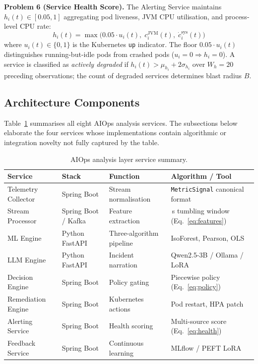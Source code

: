 \documentclass[a4paper]{lipics-v2021}
\newcommand{\mypara}[1]{{\vspace{0.1mm}\noindent\textbf{#1}}}
\begin{document}
\mypara{Problem 6 (Service Health Score).}
The Alerting Service maintains $h_i(t) \in [0.05, 1]$ aggregating pod liveness,
JVM CPU utilisation, and process-level CPU rate:
\begin{equation}
    h_i(t) = \max\!\bigl(0.05 \cdot u_i(t),\; c_i^{\text{JVM}}(t),\;
    \dot{c}_i^{\text{sys}}(t)\bigr)
    \label{eq:health}
\end{equation}
where $u_i(t) \in \{0,1\}$ is the Kubernetes \texttt{up} indicator. The floor
$0.05 \cdot u_i(t)$ distinguishes running-but-idle pods from crashed pods
($u_i{=}0 \Rightarrow h_i{=}0$). A service is classified as \textit{actively
degraded} if $h_i(t) > \mu_{h_i} + 2\sigma_{h_i}$ over $W_h{=}20$ preceding
observations; the count of degraded services determines blast radius $B$.

\subsection{Architecture Components}

Table~\ref{tab:components} summarises all eight AIOps analysis services. The
subsections below elaborate the four services whose implementations contain
algorithmic or integration novelty not fully captured by the table.

\begin{table}[t]
\caption{AIOps analysis layer service summary.}
\label{tab:components}
\small
\begin{tabular}{>{\raggedright\arraybackslash}p{3.0cm}
                >{\raggedright\arraybackslash}p{2.5cm}
                >{\raggedright\arraybackslash}p{2.8cm}
                >{\raggedright\arraybackslash}p{4.0cm}}
\toprule
\textbf{Service} & \textbf{Stack} & \textbf{Function} & \textbf{Algorithm / Tool}\\
\midrule
Telemetry Collector & Spring Boot         & Stream normalisation    & \texttt{MetricSignal} canonical format\\
Stream Processor    & Spring Boot / Kafka & Feature extraction      & 60\,s tumbling window (Eq.~\ref{eq:features})\\
ML Engine           & Python FastAPI      & Three-algorithm pipeline & IsoForest, Pearson, OLS\\
LLM Engine          & Python FastAPI      & Incident narration      & Qwen2.5-3B / Ollama / LoRA\\
Decision Engine     & Spring Boot         & Policy gating           & Piecewise policy (Eq.~\ref{eq:policy})\\
Remediation Engine  & Spring Boot         & Kubernetes actions      & Pod restart, HPA patch\\
Alerting Service    & Spring Boot         & Health scoring          & Multi-source score (Eq.~\ref{eq:health})\\
Feedback Service    & Spring Boot         & Continuous learning     & MLflow / PEFT LoRA\\
\bottomrule
\end{tabular}
\end{table}
\end{document}
